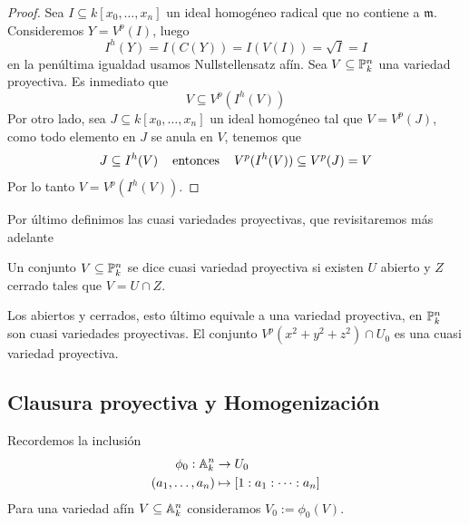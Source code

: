 \documentclass[11pt]{article}
\def \m {\mathfrak{m}}
\begin{document}
\begin{proof}
    Sea $I\subseteq k[x_{0},\dots,x_{n}]$ un ideal homogéneo radical que no contiene a $\m$.
    Consideremos $Y=V^{p}(I)$, luego
    \begin{equation*}
        I^{h}(Y)=I(C(Y))=I(V(I))=\sqrt{I}=I
    \end{equation*}
    en la penúltima igualdad usamos Nullstellensatz afín. Sea $V\subseteq\P_{k}^{n}$ una variedad 
    proyectiva. Es inmediato que
    \begin{equation*}
        V\subseteq V^{p}(I^{h}(V))
    \end{equation*}
    Por otro lado, sea $J\subseteq k[x_{0},\dots,x_{n}]$ un ideal homogéneo tal que $V=V^{p}(J)$,
    como todo elemento en $J$ se anula en $V$, tenemos que
    \begin{equation*}
        J\subseteq I^{h}(V) \hhtext{entonces} V^{p}(I^{h}(V))\subseteq V^{p}(J)=V
    \end{equation*}
    Por lo tanto $V=V^{p}(I^{h}(V))$.
\end{proof}

\noindent Por último definimos las cuasi variedades proyectivas, que revisitaremos más adelante

\begin{dfn}
    Un conjunto $V\subseteq\P_{k}^{n}$ se dice cuasi variedad proyectiva si existen $U$ abierto y
    $Z$ cerrado tales que $V=U\cap Z$.
\end{dfn}

\begin{ejm}
    Los abiertos y cerrados, esto último equivale a una variedad proyectiva, en $\P_{k}^{n}$ son
    cuasi variedades proyectivas. El conjunto $V^{p}(x^{2}+y^{2}+z^{2})\cap U_{0}$ es una cuasi 
    variedad proyectiva.
\end{ejm}

\newpage

\subsection{Clausura proyectiva y Homogenización} %

\noindent Recordemos la inclusión
\begin{align*}
    \phi_{0}:\A_{k}^{n} &\to U_{0} \\
    (a_{1},\dots,a_{n}) &\mapsto [1:a_{1}:\dots:a_{n}]
\end{align*}
Para una variedad afín $V\subseteq\A_{k}^{n}$ consideramos $V_{0}:=\phi_{0}(V)$.
\end{document}
